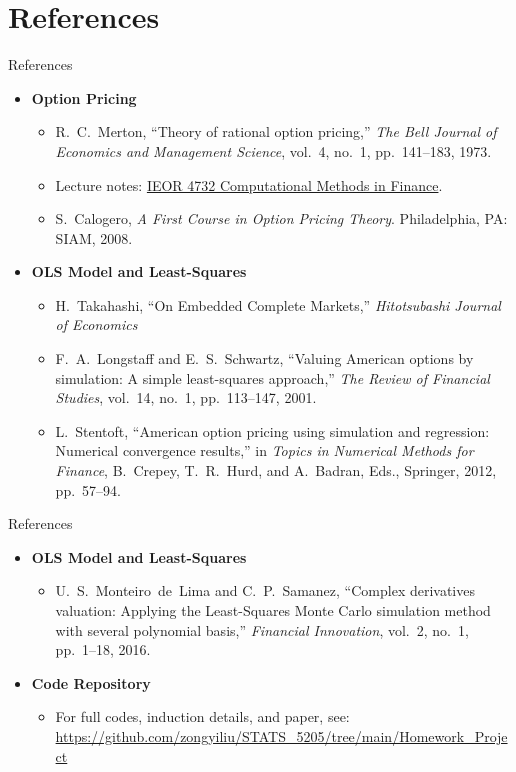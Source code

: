\documentclass[aspectratio=169,xcolor=dvipsnames]{beamer}
\begin{document}
\section{References}
\begin{frame}{References}
	\begin{itemize}
		
		\item \textbf{Option Pricing}
		\begin{itemize}
			\item R.~C.~Merton, ``Theory of rational option pricing,'' \textit{The Bell Journal of Economics and Management Science}, vol.~4, no.~1, pp.~141--183, 1973.
			\item Lecture notes: \href{https://api.pageplace.de/preview/DT0400.9781466576049_A37765636/preview-9781466576049_A37765636.pdf}{IEOR 4732 Computational Methods in Finance}.
			\item S.~Calogero, \textit{A First Course in Option Pricing Theory}. Philadelphia, PA: SIAM, 2008.
		\end{itemize}
		
		\item \textbf{OLS Model and Least-Squares}
		\begin{itemize}
			\item H.~Takahashi, ``On Embedded Complete Markets,'' \textit{Hitotsubashi Journal of Economics}
			\item F.~A.~Longstaff and E.~S.~Schwartz, ``Valuing American options by simulation: A simple least-squares approach,'' \textit{The Review of Financial Studies}, vol.~14, no.~1, pp.~113--147, 2001.
			\item L.~Stentoft, ``American option pricing using simulation and regression: Numerical convergence results,'' in \textit{Topics in Numerical Methods for Finance}, B.~Crepey, T.~R.~Hurd, and A.~Badran, Eds., Springer, 2012, pp.~57--94.
		\end{itemize}
	\end{itemize}
\end{frame}
\begin{frame}{References}
\begin{itemize}
	
	\item \textbf{OLS Model and Least-Squares}
	\begin{itemize}
		\item U.~S.~Monteiro~de~Lima and C.~P.~Samanez, ``Complex derivatives valuation: Applying the Least-Squares Monte Carlo simulation method with several polynomial basis,'' \textit{Financial Innovation}, vol.~2, no.~1, pp.~1--18, 2016.
	\end{itemize}

		\item \textbf{Code Repository}
		\begin{itemize}
			\item For full codes, induction details, and paper, see: \url{https://github.com/zongyiliu/STATS_5205/tree/main/Homework_Project}
		\end{itemize}
		
	\end{itemize}
\end{frame}

	
\end{document}
